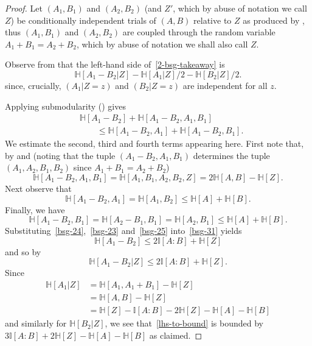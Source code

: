 \documentclass[10pt,a4paper]{article}
\newcommand{\uses}[1]{}
\newcommand{\leanok}{}
\newcommand{\bbH}{\mathbb{H}}
\newcommand{\bbI}{\mathbb{I}}
\begin{document}
\begin{proof}
  \uses{cond-indep-exist, cond-trial-ent, conditional-entropy-def,submodularity, copy-ent, relabeled-entropy, add-entropy, ruz-indep}
  \leanok
Let $(A_1, B_1)$ and $(A_2, B_2)$ (and $Z'$, which by abuse of notation we call $Z$) be conditionally independent trials of $(A,B)$ relative to $Z$ as produced by , thus $(A_1,B_1)$ and $(A_2,B_2)$ are coupled through the random variable $A_1 + B_1 = A_2 + B_2$, which by abuse of notation we shall also call $Z$.

Observe from  that the left-hand side of~\eqref{2-bsg-takeaway} is
\begin{equation}\label{lhs-to-bound}
\bbH[A_1 - B_2| Z] - \bbH[A_1 | Z]/2 - \bbH[B_2 | Z]/2.
\end{equation}
since, crucially, $(A_1 | Z=z)$ and $(B_2 | Z=z)$ are independent for all $z$.

Applying submodularity () gives
\begin{equation}\label{bsg-31} \begin{split}
&\bbH[A_1 - B_2] + \bbH[A_1 - B_2, A_1, B_1] \\
&\qquad \leq \bbH[A_1 - B_2, A_1] + \bbH[A_1 - B_2,B_1].
\end{split}\end{equation}
We estimate the second, third and fourth terms appearing here.
First note that, by  and  (noting that the tuple $(A_1 - B_2, A_1, B_1)$  determines the tuple $(A_1, A_2, B_1, B_2)$ since $A_1+B_1=A_2+B_2$)
\begin{equation}\label{bsg-24} \bbH[A_1 - B_2, A_1, B_1] = \bbH[A_1, B_1, A_2, B_2,Z] = 2\bbH[A,B] - \bbH[Z].\end{equation}
Next observe that
\begin{equation}\label{bsg-23} \bbH[A_1 - B_2, A_1] = \bbH[A_1, B_2] \leq \bbH[A] + \bbH[B].
\end{equation}
Finally, we have
\begin{equation}\label{bsg-25} \bbH[A_1 - B_2, B_1] = \bbH[A_2 - B_1, B_1] = \bbH[A_2, B_1] \leq \bbH[A] + \bbH[B].\end{equation}
Substituting~\eqref{bsg-24},~\eqref{bsg-23} and~\eqref{bsg-25} into~\eqref{bsg-31} yields
\[\bbH[A_1 - B_2] \leq 2 \bbI[A:B] + \bbH[Z]\] and so by 
\[\bbH[A_1 - B_2 | Z]  \leq 2 \bbI[A:B] + \bbH[Z].\]
Since
\begin{align*} \bbH[A_1 | Z] & = \bbH[A_1, A_1 + B_1] - \bbH[Z] \\ & = \bbH[A,B] - \bbH[Z] \\ & = \bbH[Z] -  \bbI[A:B] - 2 \bbH[Z]- \bbH[A]-\bbH[B]\end{align*}
and similarly for $\bbH[B_2 | Z]$, we see that~\eqref{lhs-to-bound} is bounded by
$3 \bbI[A:B] + 2\bbH[Z]-\bbH[A]-\bbH[B]$ as claimed.
\end{proof}
\end{document}
